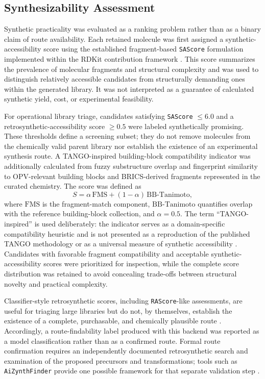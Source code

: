 \documentclass[12pt]{article}
\begin{document}
\subsection{Synthesizability Assessment}
Synthetic practicality was evaluated as a ranking problem rather than as a binary claim of route availability. Each retained molecule was first assigned a synthetic-accessibility score using the established fragment-based \texttt{SAScore} formulation implemented within the RDKit contribution framework \cite{sascore}. This score summarizes the prevalence of molecular fragments and structural complexity and was used to distinguish relatively accessible candidates from structurally demanding ones within the generated library. It was not interpreted as a guarantee of calculated synthetic yield, cost, or experimental feasibility.

For operational library triage, candidates satisfying \texttt{SAScore} $\leq 6.0$ and a retrosynthetic-accessibility score $\geq 0.5$ were labeled synthetically promising. These thresholds define a screening subset; they do not remove molecules from the chemically valid parent library nor establish the existence of an experimental synthesis route. A TANGO-inspired building-block compatibility indicator was additionally calculated from fuzzy substructure overlap and fingerprint similarity to OPV-relevant building blocks and BRICS-derived fragments represented in the curated chemistry. The score was defined as
\begin{equation}
S=\alpha\,\mathrm{FMS}+(1-\alpha)\,\mathrm{BB\text{-}Tanimoto},
\end{equation}
where $\mathrm{FMS}$ is the fragment-match component, 
$\mathrm{BB\text{-}Tanimoto}$ quantifies overlap with the reference 
building-block collection, and $\alpha=0.5$. The term ``TANGO-inspired'' is used deliberately: the indicator serves as a domain-specific compatibility heuristic and is not presented as a reproduction of the published TANGO methodology or as a universal measure of synthetic accessibility \cite{tango}. Candidates with favorable fragment compatibility and acceptable synthetic-accessibility scores were prioritized for inspection, while the complete score distribution was 
retained to avoid concealing trade-offs between structural novelty and practical complexity.

Classifier-style retrosynthetic scores, including \texttt{RAScore}-like assessments, are useful for triaging large libraries but do not, by themselves, establish the existence of a complete, purchasable, and chemically plausible route \cite{rascore}. Accordingly, a route-findability label produced with this backend was reported as a model classification rather than as a confirmed route. Formal route confirmation requires an independently documented retrosynthetic search and examination of the proposed precursors and transformations; tools such as \texttt{AiZynthFinder} provide one possible framework for that separate validation step \cite{genheden2020aizynthfinder}.
\end{document}
